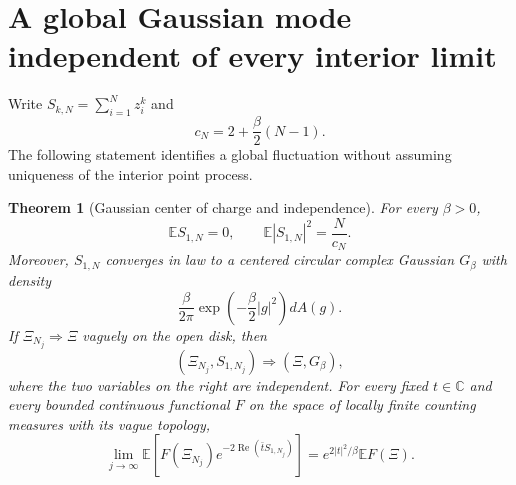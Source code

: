 \documentclass[11pt,a4paper]{article}
\numberwithin{equation}{section}
\newtheorem{theorem}{Theorem}[section]
\theoremstyle{definition}
\theoremstyle{remark}
\begin{document}
\section{A global Gaussian mode independent of every interior limit}

Write $S_{k,N}=\sum_{i=1}^N z_i^k$ and
\[
 c_N=2+\frac\beta2(N-1).
\]
The following statement identifies a global fluctuation without assuming
uniqueness of the interior point process.

\begin{theorem}[Gaussian center of charge and independence]
For every $\beta>0$,
\[
 \mathbb E S_{1,N}=0,\qquad
 \mathbb E|S_{1,N}|^2=\frac{N}{c_N}.
\]
Moreover, $S_{1,N}$ converges in law to a centered circular complex Gaussian
$G_\beta$ with density
\[
 \frac{\beta}{2\pi}\exp\left(-\frac\beta2|g|^2\right)dA(g).
\]
If $\Xi_{N_j}\Rightarrow\Xi$ vaguely on the open disk, then
\[
 (\Xi_{N_j},S_{1,N_j})\Rightarrow(\Xi,G_\beta),
\]
where the two variables on the right are independent.
For every fixed $t\in\mathbb C$ and every bounded continuous functional $F$
on the space of locally finite counting measures with its vague topology,
\[
 \lim_{j\to\infty}
 \mathbb E\left[F(\Xi_{N_j})e^{-2\operatorname{Re}(\bar tS_{1,N_j})}\right]
 =e^{2|t|^2/\beta}\mathbb EF(\Xi).
\]
\end{theorem}
\end{document}
